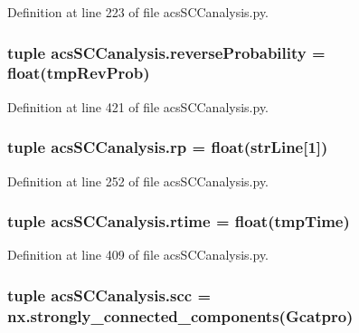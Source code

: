 Definition at line 223 of file acs\-S\-C\-Canalysis.\-py.

\hypertarget{a00096_aa7db2dba66810044f9c5238eccc995b7}{
\subsubsection[{reverse\-Probability}]{\setlength{\rightskip}{0pt plus 5cm}tuple acs\-S\-C\-Canalysis.\-reverse\-Probability = float(tmp\-Rev\-Prob)}}\label{a00096_aa7db2dba66810044f9c5238eccc995b7}


Definition at line 421 of file acs\-S\-C\-Canalysis.\-py.

\hypertarget{a00096_a98150f532e09ebae495212500d2f1799}{
\subsubsection[{rp}]{\setlength{\rightskip}{0pt plus 5cm}tuple acs\-S\-C\-Canalysis.\-rp = float({\bf str\-Line}\mbox{[}1\mbox{]})}}\label{a00096_a98150f532e09ebae495212500d2f1799}


Definition at line 252 of file acs\-S\-C\-Canalysis.\-py.

\hypertarget{a00096_a162a08b0497058c76e7e885c03a01336}{
\subsubsection[{rtime}]{\setlength{\rightskip}{0pt plus 5cm}tuple acs\-S\-C\-Canalysis.\-rtime = float(tmp\-Time)}}\label{a00096_a162a08b0497058c76e7e885c03a01336}


Definition at line 409 of file acs\-S\-C\-Canalysis.\-py.

\hypertarget{a00096_a2094b7f0917a16a948a2d1c4d700e84c}{
\subsubsection[{scc}]{\setlength{\rightskip}{0pt plus 5cm}tuple acs\-S\-C\-Canalysis.\-scc = nx.\-strongly\-\_\-connected\-\_\-components({\bf Gcatpro})}}\label{a00096_a2094b7f0917a16a948a2d1c4d700e84c}


